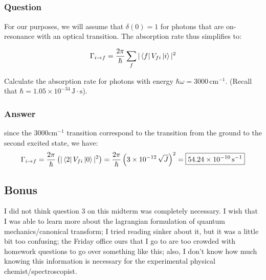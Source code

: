 \documentclass[12pt]{article}
\begin{document}
\subsection{}
\subsubsection{Question}

For our purposes, we will assume that \(\delta(0) = 1\) for photons that are on-resonance with an optical transition. The absorption rate thus simplifies to:

\[
\Gamma_{i \rightarrow f} = \frac{2\pi}{\hbar} \sum_{f} |\bra{f}V_{fi}\ket{i}|^{2}
\]

Calculate the absorption rate for photons with energy \(\hbar\omega = 3000 \, \text{cm}^{-1}\). (Recall that \(\hbar = 1.05 \times 10^{-34} \, \text{J} \cdot \text{s}\)).
\subsubsection{Answer}
since the $3000 \text{cm}^{-1}$ transition correspond to the transition from the ground to the second excited state, we have:
\begin{equation}
    \Gamma_{i \rightarrow f} = \frac{2\pi}{\hbar} \left(|\bra{2}V_{fi}\ket{0}|^{2}\right) = \frac{2\pi}{\hbar} \left(3 \times 10^{-12} \, \sqrt{J}\right)^2 = \boxed{54.24 \times 10^{-10} \, \text{s}^{-1}}
\end{equation} 



\subsection{Bonus}
I did not think question 3 on this midterm was completely necessary. I wish that I was able to learn more about the lagrangian formulation of quantum mechanics/canonical transform; I tried reading sinker about it, but it was a little bit too confusing; the Friday office ours that I go to are too crowded with homework questions to go over something like this; also, I don't know how much knowing this information is necessary for the experimental physical chemist/spectroscopist.
\end{document}
